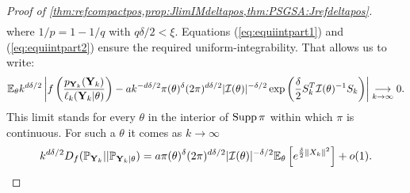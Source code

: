 \begin{proof}[Proof of \cref{thm:refcompactpos,prop:JlimIMdeltapos,thm:PSGSA:Jrefdeltapos}]
\begin{align}
\end{align}
where $1/p=1-1/q$ with $q\delta/2<\xi$. Equations (\ref{eq:equiintpart1}) and (\ref{eq:equiintpart2}) ensure the required uniform-integrability. %
That allows us to write:
    \begin{equation}
        \mathbb{E}_\theta k^{d\delta/2}\left|f\left(\frac{p_{\mathbf{Y}_k}(\mathbf{Y}_k)}{\ell_k(\mathbf{Y}_k|\theta)}\right)  - a k^{-d\delta/2}\pi(\theta)^\delta(2\pi)^{d\delta/2}|\mathcal{I}(\theta)|^{-\delta/2}\exp\left(\frac{\delta}{2} S_k^T\mathcal{I}(\theta)^{-1}S_k \right)  \right|
        \overset{\ }{\underset{k\rightarrow\infty}{\longrightarrow}}0.
    \end{equation}
This limit stands for every $\theta$ in the interior of $\operatorname{Supp}\pi$ within which $\pi$ is continuous. For such a $\theta$ it comes as $k\rightarrow\infty$
\begin{align}
    k^{d\delta/2} D_f(\mathbb{P}_{\mathbf{Y}_k} || \mathbb{P}_{\mathbf{Y}_k|\theta}) = a\pi(\theta)^\delta(2\pi)^{d\delta/2}|\mathcal{I}(\theta)|^{-\delta/2}\mathbb{E}_\theta\left[e^{\frac{\delta}{2} \|X_k\|^2}\right] + o(1).    
\end{align}


\end{proof}
